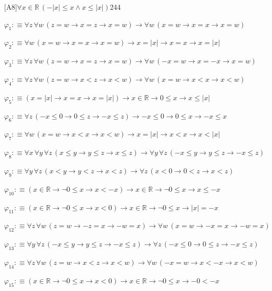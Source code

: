 \begin{fullproof}{[A8]}{$\forall x \in \mathbb{R}\,(-\lvert x \rvert \leq x \land x \leq \lvert x \rvert)$}{244}
\begin{ptree}
\end{ptree}
\begin{abbrevlist}
\item $\varphi_{1} :\equiv \forall z\,\forall w\,(z = w \to x = z \to x = w) \to \forall w\,(x = w \to x = x \to x = w)$
\item $\varphi_{2} :\equiv \forall w\,(x = w \to x = x \to x = w) \to x = \lvert x \rvert \to x = x \to x = \lvert x \rvert$
\item $\varphi_{3} :\equiv \forall z\,\forall w\,(z = w \to x = z \to x = w) \to \forall w\,(-x = w \to x = -x \to x = w)$
\item $\varphi_{4} :\equiv \forall z\,\forall w\,(z = w \to x < z \to x < w) \to \forall w\,(x = w \to x < x \to x < w)$
\item $\varphi_{5} :\equiv (x = \lvert x \rvert \to x = x \to x = \lvert x \rvert) \to x \in \mathbb{R} \to 0 \leq x \to x \leq \lvert x \rvert$
\item $\varphi_{6} :\equiv \forall z\,(-x \leq 0 \to 0 \leq z \to -x \leq z) \to -x \leq 0 \to 0 \leq x \to -x \leq x$
\item $\varphi_{7} :\equiv \forall w\,(x = w \to x < x \to x < w) \to x = \lvert x \rvert \to x < x \to x < \lvert x \rvert$
\item $\varphi_{8} :\equiv \forall x\,\forall y\,\forall z\,(x \leq y \to y \leq z \to x \leq z) \to \forall y\,\forall z\,(-x \leq y \to y \leq z \to -x \leq z)$
\item $\varphi_{9} :\equiv \forall y\,\forall z\,(x < y \to y < z \to x < z) \to \forall z\,(x < 0 \to 0 < z \to x < z)$
\item $\varphi_{10} :\equiv (x \in \mathbb{R} \to \neg 0 \leq x \to x < -x) \to x \in \mathbb{R} \to \neg 0 \leq x \to x \leq -x$
\item $\varphi_{11} :\equiv (x \in \mathbb{R} \to \neg 0 \leq x \to x < 0) \to x \in \mathbb{R} \to \neg 0 \leq x \to \lvert x \rvert = -x$
\item $\varphi_{12} :\equiv \forall z\,\forall w\,(z = w \to -z = x \to -w = x) \to \forall w\,(x = w \to -x = x \to -w = x)$
\item $\varphi_{13} :\equiv \forall y\,\forall z\,(-x \leq y \to y \leq z \to -x \leq z) \to \forall z\,(-x \leq 0 \to 0 \leq z \to -x \leq z)$
\item $\varphi_{14} :\equiv \forall z\,\forall w\,(z = w \to x < z \to x < w) \to \forall w\,(-x = w \to x < -x \to x < w)$
\item $\varphi_{15} :\equiv (x \in \mathbb{R} \to \neg 0 \leq x \to x < 0) \to x \in \mathbb{R} \to \neg 0 \leq x \to -0 < -x$

\end{abbrevlist}
\end{fullproof}
